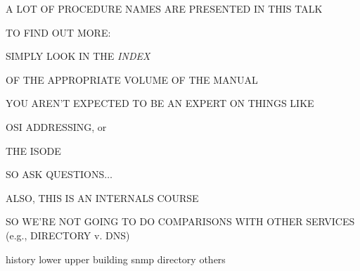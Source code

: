 \begin{bwslide}

\begin{nrtc}
\item	A LOT OF PROCEDURE NAMES ARE PRESENTED IN THIS TALK

\item	TO FIND OUT MORE:
    \begin{nrtc}
    \item	SIMPLY LOOK IN THE \emph{INDEX}

    \item	OF THE APPROPRIATE VOLUME OF THE MANUAL
    \end{nrtc}
\end{nrtc}
\end{bwslide}


\begin{bwslide}

\begin{nrtc}
\item	YOU AREN'T EXPECTED TO BE AN EXPERT ON THINGS LIKE
    \begin{nrtc}
    \item	OSI ADDRESSING, or

    \item	THE ISODE
    \end{nrtc}
    SO ASK QUESTIONS$\ldots$

\item	ALSO, THIS IS AN INTERNALS COURSE
    \begin{nrtc}
    \item	SO WE'RE NOT GOING TO DO COMPARISONS WITH OTHER SERVICES
		(e.g., DIRECTORY v. DNS)
    \end{nrtc}
\end{nrtc}
\end{bwslide}


	{history}
	{lower}
	{upper}
	{building}
	{snmp}
	{directory}
	{others}


